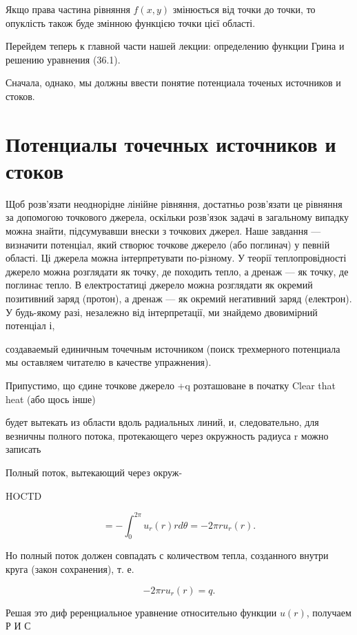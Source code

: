 \documentclass[
  ukrainian,
]{article}
\begin{document}
Якщо права частина рівняння \(f(x, y)\) змінюється від точки до точки,
то опуклість також буде змінною функцією точки цієї області.

Перейдем теперь к главной части нашей лекции: определению функции Грина
и решению уравнения (36.1).

Сначала, однако, мы должны ввести понятие потенциала точеных источников
и стоков.

\section{Потенциалы точечных источников и
стоков}\label{ux43fux43eux442ux435ux43dux446ux438ux430ux43bux44b-ux442ux43eux447ux435ux447ux43dux44bux445-ux438ux441ux442ux43eux447ux43dux438ux43aux43eux432-ux438-ux441ux442ux43eux43aux43eux432}

Щоб розв'язати неоднорідне лінійне рівняння, достатньо розв'язати це
рівняння за допомогою точкового джерела, оскільки розв'язок задачі в
загальному випадку можна знайти, підсумувавши внески з точкових джерел.
Наше завдання --- визначити потенціал, який створює точкове джерело (або
поглинач) у певній області. Ці джерела можна інтерпретувати по-різному.
У теорії теплопровідності джерело можна розглядати як точку, де походить
тепло, а дренаж --- як точку, де поглинає тепло. В електростатиці
джерело можна розглядати як окремий позитивний заряд (протон), а дренаж
--- як окремий негативний заряд (електрон). У будь-якому разі, незалежно
від інтерпретації, ми знайдемо двовимірний потенціал і,

создаваемый единичным точечным источником (поиск трехмерного потенциала
мы оставляем читателю в качестве упражнения).

Припустимо, що єдине точкове джерело +q розташоване в початку Clear that
heat (або щось інше)

будет вытекать из области вдоль радиальных линий, и, следовательно, для
везничны полного потока, протекающего через окружность радиуса r можно
записать

Полный поток, вытекающий через окруж-

HOCTD

\[
= -\int_{0}^{2\pi} u_{r}(r) r d\theta = -2\pi r u_{r}(r).
\]

Но полный поток должен совпадать с количеством тепла, созданного внутри
круга (закон сохранения), т. е.

\[
-2\pi r u_r(r) = q.
\]

Решая это диф реренциальное уравнение относительно функции \(u(r)\),
получаем Р И С
\end{document}
